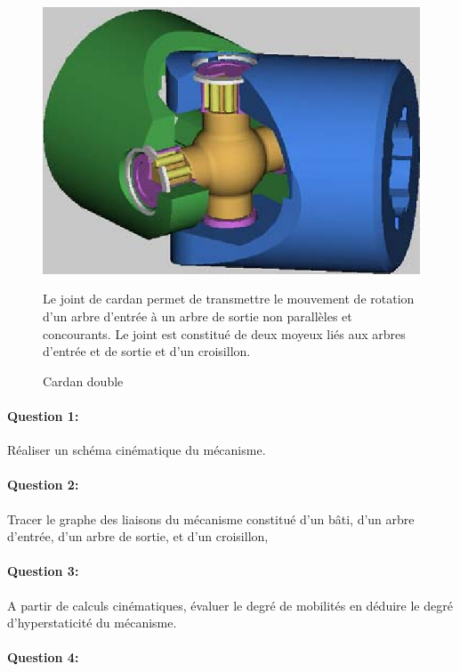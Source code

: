 \begin{figure}[htbp]
\begin{minipage}[c]{.4\linewidth}
\begin{center}
\includegraphics[width=0.7\linewidth]{img/cardan.png}
\caption{Cardan double}
\label{fig:image8}
\end{center}
\end{minipage}
\hfill
\begin{minipage}[c]{.55\linewidth}
Le joint de cardan permet de transmettre le mouvement de rotation d'un arbre d'entrée à un arbre de sortie non parallèles et concourants. Le joint est constitué de deux moyeux liés aux arbres d'entrée et de sortie et d'un croisillon.
\end{minipage}
\end{figure}

\paragraph{Question 1:}

Réaliser un schéma cinématique du mécanisme.

\paragraph{Question 2:}

Tracer le graphe des liaisons du mécanisme constitué d'un bâti, d'un arbre d'entrée, d'un arbre de sortie, et d'un croisillon,

\paragraph{Question 3:}

A partir de calculs cinématiques, évaluer le degré de mobilités en déduire le degré d'hyperstaticité du mécanisme.

\paragraph{Question 4:}

